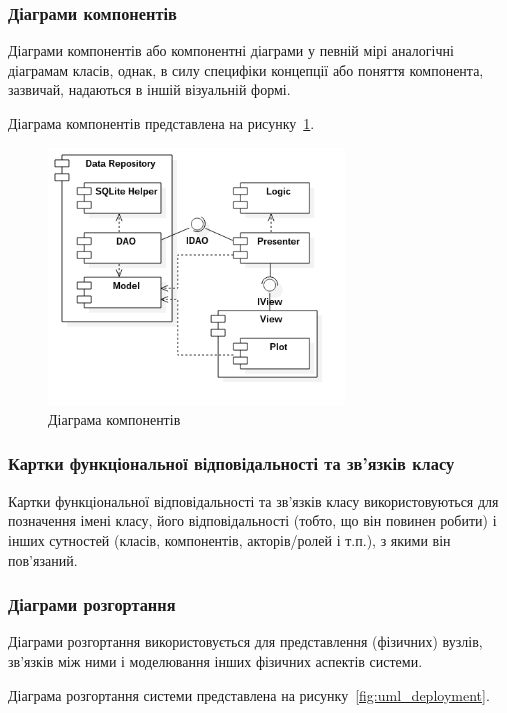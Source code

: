 \subsubsection{Діаграми компонентів}
Діаграми компонентів або компонентні діаграми у певній мірі аналогічні діаграмам класів, однак, в силу специфіки концепції або поняття компонента, зазвичай, надаються в іншій візуальній формі.

Діаграма компонентів представлена на рисунку~\ref{fig:uml_component}.

\begin{figure}[H]
  \centering
    \includegraphics[width=0.7\textwidth]{uml_component}
  \caption{Діаграма компонентів}
  \label{fig:uml_component}
\end{figure}

\subsubsection{Картки функціональної відповідальності та зв'язків класу}
Картки функціональної відповідальності та зв'язків класу використовуються для позначення імені класу, його відповідальності (тобто, що він повинен робити) і інших сутностей (класів, компонентів, акторів/ролей і т.п.), з якими він пов'язаний.

\subsubsection{Діаграми розгортання}
Діаграми розгортання використовується для представлення (фізичних) вузлів, зв'язків між ними і моделювання інших фізичних аспектів системи.

Діаграма розгортання системи представлена на рисунку~\ref{fig:uml_deployment}.

